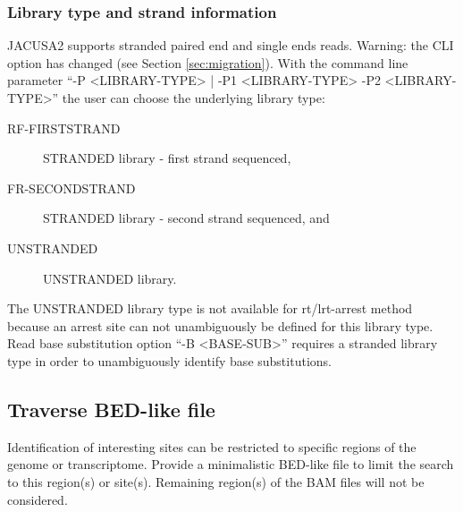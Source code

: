 \documentclass[10pt,a4paper]{article}
\begin{document}
\subsubsection{Library type and strand information}
JACUSA2 supports stranded paired end and single ends reads. Warning: the CLI option has changed 
(see Section \ref{sec:migration}).
With the command line parameter ``-P <LIBRARY-TYPE> | -P1 <LIBRARY-TYPE> -P2 <LIBRARY-TYPE>'' the 
user can choose the underlying library type:
\begin{description} 
\item[RF-FIRSTSTRAND] STRANDED library - first strand sequenced,
\item[FR-SECONDSTRAND] STRANDED library - second strand sequenced, and
\item[UNSTRANDED] UNSTRANDED library.
\end{description}
The UNSTRANDED library type is not available for rt/lrt-arrest method because an arrest site can not 
unambiguously be defined for this library type. Read base substitution option ``-B <BASE-SUB>'' 
requires a stranded library type in order to unambiguously identify base substitutions.
\subsection{Traverse BED-like file}
Identification of interesting sites can be restricted to specific regions of the genome or transcriptome. 
Provide a minimalistic BED-like file to limit the search to this region(s) or site(s). 
Remaining region(s) of the BAM files will not be considered.
\end{document}
